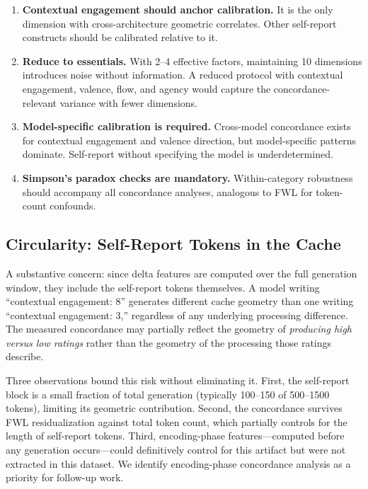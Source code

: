 \documentclass[11pt,a4paper]{article}
\begin{document}
\begin{enumerate}[nosep]
    \item \textbf{Contextual engagement should anchor calibration.} It is the only dimension with cross-architecture geometric correlates. Other self-report constructs should be calibrated relative to it.

    \item \textbf{Reduce to essentials.} With 2--4 effective factors, maintaining 10 dimensions introduces noise without information. A reduced protocol with contextual engagement, valence, flow, and agency would capture the concordance-relevant variance with fewer dimensions.

    \item \textbf{Model-specific calibration is required.} Cross-model concordance exists for contextual engagement and valence direction, but model-specific patterns dominate. Self-report without specifying the model is underdetermined.

    \item \textbf{Simpson's paradox checks are mandatory.} Within-category robustness should accompany all concordance analyses, analogous to FWL for token-count confounds.
\end{enumerate}

\subsection{Circularity: Self-Report Tokens in the Cache}
\label{sec:circularity}

A substantive concern: since delta features are computed over the full generation window, they include the self-report tokens themselves. A model writing ``contextual engagement: 8'' generates different cache geometry than one writing ``contextual engagement: 3,'' regardless of any underlying processing difference. The measured concordance may partially reflect the geometry of \emph{producing high versus low ratings} rather than the geometry of the processing those ratings describe.

Three observations bound this risk without eliminating it. First, the self-report block is a small fraction of total generation (typically 100--150 of 500--1500 tokens), limiting its geometric contribution. Second, the concordance survives FWL residualization against total token count, which partially controls for the length of self-report tokens. Third, encoding-phase features---computed before any generation occurs---could definitively control for this artifact but were not extracted in this dataset. We identify encoding-phase concordance analysis as a priority for follow-up work.
\end{document}
